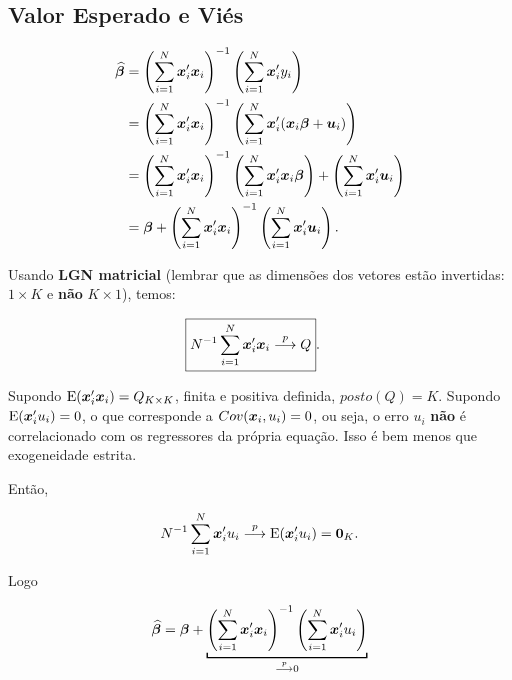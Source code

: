 \documentclass[11pt, oneside, a4paper, article]{article}
\numberwithin{equation}{section}
\begin{document}
\subsection{Valor Esperado e Viés}

\vspace{-2 em}
\begin{align*}
\widehat{\boldsymbol{\beta}} &= 
\left( \sum_{i=1}^{N} \boldsymbol{x}_{i}' \boldsymbol{x}_{i} \right)^{-1}
\left( \sum_{i=1}^{N} \boldsymbol{x}_{i}' y_{i} \right)
\\
&=
\left( \sum_{i=1}^{N} \boldsymbol{x}_{i}' \boldsymbol{x}_{i} \right)^{-1}
\left( \sum_{i=1}^{N} \boldsymbol{x}_{i}' (\boldsymbol{x}_{i} \boldsymbol{\beta} + \boldsymbol{u}_{i}) \right)
\\
&=
\left( \sum_{i=1}^{N} \boldsymbol{x}_{i}' \boldsymbol{x}_{i} \right)^{-1}
\left( \sum_{i=1}^{N} \boldsymbol{x}_{i}' \boldsymbol{x}_{i} \boldsymbol{\beta} \right) +
\left( \sum_{i=1}^{N} \boldsymbol{x}_{i}' \boldsymbol{u}_{i} \right)
\\
&=
\boldsymbol{\beta} +
\left( \sum_{i=1}^{N} \boldsymbol{x}_{i}' \boldsymbol{x}_{i} \right)^{-1}
\left( \sum_{i=1}^{N} \boldsymbol{x}_{i}' \boldsymbol{u}_{i} \right).
\end{align*}

\noindent
Usando \textbf{LGN matricial} (lembrar que as dimensões dos vetores estão invertidas: $1 \times K$ e \textbf{não} $K \times 1$), temos:

\vspace{-1 em}
\begin{align} \label{eq:Q}
	\Aboxed{N^{-1} \sum_{i=1}^{N} \mbs{x}_{i}' \mbs{x}_{i} \arrowp Q }.
\end{align}

\noindent
Supondo $\text{E}(\boldsymbol{x}_{i}' \boldsymbol{x}_{i}) = Q_{K \times K}$, finita e positiva definida, $posto(Q) = K$.
Supondo $\text{E}(\boldsymbol{x}_{i}' u_{i}) = 0$, o que corresponde a $Cov(\boldsymbol{x}_{i}, u_{i}) = 0$, ou seja, o erro $u_{i}$ \textbf{não} é correlacionado com os regressores da própria equação.
Isso é bem menos que exogeneidade estrita.

Então, 

\vspace{-1 em}
\begin{align*}
	N^{-1} \sum_{i=1}^{N} \boldsymbol{x}_{i}' u_{i}  \overset{p}{\longrightarrow}  \text{E}(\boldsymbol{x}_{i}' u_{i}) = \boldsymbol{0}_{K}.
\end{align*}

Logo

\vspace{-1 em}
\begin{align*}
\betahatbold = 
\betavec +
\underbracket[1pt]{
\left( \sum_{i=1}^{N} \mbs{x}_{i}' \mbs{x}_{i} \right)^{-1}
\left( \sum_{i=1}^{N} \mbs{x}_{i}' u_{i} \right)}_{\arrowp 0}
\end{align*}
\end{document}
